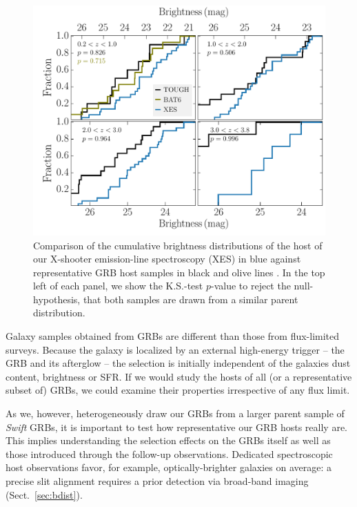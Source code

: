 \documentclass[traditabstract, longauth]{aa}
\begin{document}
\begin{figure}
\includegraphics[angle=0, width=0.99\columnwidth]{Figs/Bdist.pdf}
\caption{Comparison of the cumulative brightness distributions of the host of our X-shooter emission-line spectroscopy (XES) in blue against representative GRB host samples in black and olive lines \citep{2012ApJ...756..187H, 2014arXiv1409.7064V}. In the top left of each panel, we show the K.S.-test $p$-value to reject the null-hypothesis, that both samples are drawn from a similar parent distribution.}
\label{fig:selection}
\end{figure}

 {Galaxy samples obtained from GRBs are different than those from flux-limited surveys. Because the galaxy is localized by an external high-energy trigger -- the GRB and its afterglow -- the selection is initially independent of the galaxies dust content, brightness or SFR. If we would study the hosts of all (or a representative subset of) GRBs, we could examine their properties irrespective of any flux limit.}

 {As we, however, heterogeneously draw our GRBs from a larger parent sample of \textit{Swift} GRBs, it is important to test how representative our GRB hosts really are. This implies understanding the selection effects on the GRBs itself as well as those introduced through the follow-up observations. Dedicated spectroscopic host observations favor, for example, optically-brighter galaxies on average: a precise slit alignment requires a prior detection via broad-band imaging (Sect.~\ref{sec:bdist}).}
\end{document}
